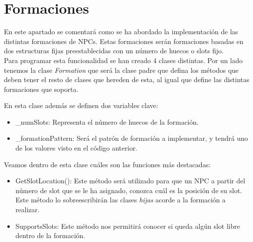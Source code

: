 \section{Formaciones}
En este apartado se comentará como se ha abordado la implementación de las distintas formaciones de NPCs. Estas formaciones serán formaciones basadas en dos estructuras fijas preestablecidas con un número de huecos o slots fijo.\\

Para programar esta funcionalidad se han creado 4 clases distintas. Por un lado tenemos la clase \textit{Formation} que será la clase padre que defina los métodos que deben tener el resto de clases que hereden de esta, al igual que define las distintas formaciones que soporta.



En esta clase además se definen dos variables clave:
\begin{itemize}
    \item \_numSlots: Representa el número de huecos de la formación.
    \item \_formationPattern: Será el patrón de formación a implementar, y tendrá uno de los valores visto en el código anterior.
\end{itemize}

Veamos dentro de esta clase cuáles son las funciones más destacadas:
\begin{itemize}
    \item GetSlotLocation(): Este método será utilizado para que un NPC a partir del número de slot que se le ha asignado, conozca cuál es la posición de su slot. Este método lo sobreescribirán las clases \textit{hijas} acorde a la formación a realizar.
    \item SupportsSlots: Este método nos permitirá conocer si queda algún slot libre dentro de la formación.
\end{itemize}


